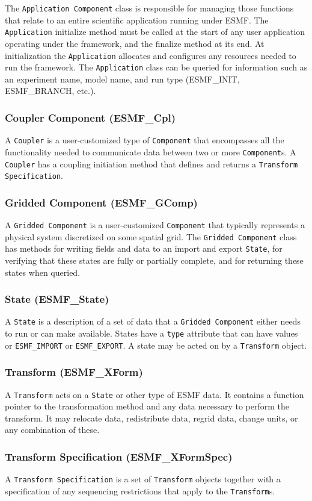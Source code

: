 The {\tt Application Component} class is responsible for managing those 
functions that relate to an entire scientific application running under ESMF.
The {\tt Application} initialize method 
must be called at the start of any user application operating under the framework, and
the finalize method at its end.  At initialization the {\tt Application} allocates and 
configures any resources needed to run the framework.  The {\tt Application}
class can be queried for information such as an experiment name, model name, and run 
type (ESMF\_INIT, ESMF\_BRANCH, etc.).  

\subsubsection{Coupler Component (ESMF\_Cpl)}
A {\tt Coupler} is a user-customized type of {\tt Component} that 
encompasses all the functionality needed to communicate data between two or 
more {\tt Component}s.  A {\tt Coupler} has a coupling initiation method that 
defines and returns a {\tt Transform Specification}.

\subsubsection{Gridded Component (ESMF\_GComp)}
\label{sec:griddedcomponent} 
A {\tt Gridded Component} is a user-customized {\tt Component} 
that typically represents a physical system discretized on some spatial grid.
The {\tt Gridded Component} class has methods for writing 
fields and data to an import and export {\tt State}, for verifying that
these states are fully or partially complete, and for returning these
states when queried.

\subsubsection{State (ESMF\_State)}
A {\tt State} is a description of a set of data that a 
{\tt Gridded Component} either needs to run or can make available.  States
have a {\tt type} attribute that can have values or {\tt ESMF\_IMPORT} or
{\tt ESMF\_EXPORT}.  A state may be acted on by a {\tt Transform} object.

\subsubsection{Transform (ESMF\_XForm)} 
A {\tt Transform} acts on a {\tt State} or other type of 
ESMF data.  It contains a function pointer to the transformation method 
and any data necessary to perform the transform.  It may relocate data, 
redistribute data, regrid data, change units, or any combination of these.  

\subsubsection{Transform Specification (ESMF\_XFormSpec)} 
A {\tt Transform Specification} is a set of {\tt Transform} objects
together with a specification of any sequencing restrictions that apply to 
the {\tt Transform}s.








